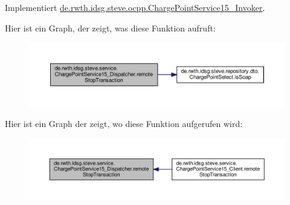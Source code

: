 Implementiert \hyperlink{interfacede_1_1rwth_1_1idsg_1_1steve_1_1ocpp_1_1_charge_point_service15___invoker_a50d840b72b8705214b4c5d9e235be133}{de.\-rwth.\-idsg.\-steve.\-ocpp.\-Charge\-Point\-Service15\-\_\-\-Invoker}.



Hier ist ein Graph, der zeigt, was diese Funktion aufruft\-:\nopagebreak
\begin{figure}[H]
\begin{center}
\leavevmode
\includegraphics[width=350pt]{classde_1_1rwth_1_1idsg_1_1steve_1_1service_1_1_charge_point_service15___dispatcher_a200f857a13ee5fdea3d81fd0634e6dd2_cgraph}
\end{center}
\end{figure}




Hier ist ein Graph der zeigt, wo diese Funktion aufgerufen wird\-:\nopagebreak
\begin{figure}[H]
\begin{center}
\leavevmode
\includegraphics[width=350pt]{classde_1_1rwth_1_1idsg_1_1steve_1_1service_1_1_charge_point_service15___dispatcher_a200f857a13ee5fdea3d81fd0634e6dd2_icgraph}
\end{center}
\end{figure}


